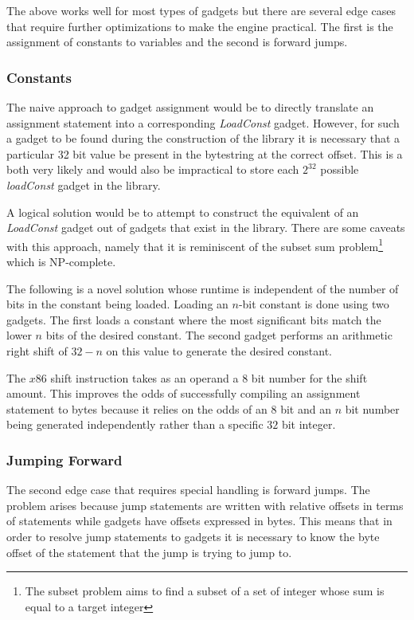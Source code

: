     The above works well for most types of gadgets but there are several
    edge cases that require further optimizations to make the engine practical.
    The first is the assignment of constants to variables and the second is
    forward jumps.

    \subsubsection{Constants}

    The naive approach to gadget assignment would be to directly translate an
    assignment statement into a corresponding \emph{LoadConst} gadget. However,
    for such a gadget to be found during the construction of the library it is
    necessary that a particular 32 bit value be present in the bytestring at the
    correct offset. This is a both very likely and would also be impractical to
    store each $2^{32}$ possible \emph{loadConst} gadget in the library. 

    A logical solution would be to attempt to construct the equivalent of an
    \emph{LoadConst} gadget out of gadgets that exist in the library. There are
    some caveats with this approach, namely that it is reminiscent of the subset
    sum problem\footnote{The subset problem aims to find a subset of a set of
    integer whose sum is equal to a target integer} which is NP-complete.

    The following is a novel solution whose runtime is independent of the number
    of bits in the constant being loaded. Loading an $n$-bit constant is done
    using two gadgets. The first loads a constant where the most significant
    bits match the lower $n$ bits of the desired constant. The second gadget
    performs an arithmetic right shift of $32-n$ on this value to generate the
    desired constant.

    The $x86$ shift instruction takes as an operand a $8$ bit number for the
    shift amount. This improves the odds of successfully compiling an assignment
    statement to bytes because it relies on the odds of an $8$ bit and an $n$
    bit number being generated independently rather than a specific $32$ bit
    integer.

    \subsubsection{Jumping Forward}

    The second edge case that requires special handling is forward jumps. The
    problem arises because jump statements are written with relative offsets in
    terms of statements while gadgets have offsets expressed in bytes. This
    means that in order to resolve jump statements to gadgets it is necessary to
    know the byte offset of the statement that the jump is trying to jump to.

